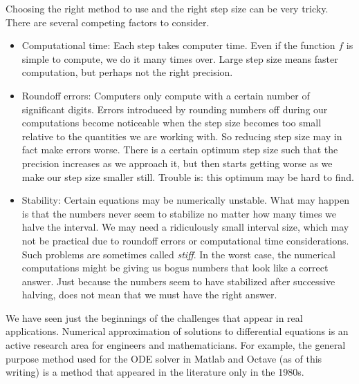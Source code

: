Choosing the right method to use and the right step size can be very tricky.
There are several competing factors to consider.
\begin{itemize}
\item Computational time:  Each step takes computer time.  Even if the
function $f$ is simple to compute, we do it many times over.
Large step size means faster computation, but perhaps not
the right precision.
\item Roundoff errors: Computers only compute with a certain number of
significant digits.  Errors introduced by rounding numbers off during our
computations become noticeable when the step size becomes
too small relative to the quantities we are working with.
So reducing
step size may in fact make errors worse.
There is a certain optimum step size
such that the precision increases as we approach it, but then starts getting
worse as we make our step size
smaller still.  Trouble is: this optimum may be hard to find.
\item Stability: Certain equations may be numerically unstable.  What may
happen is that the numbers never seem to stabilize no matter how many times
we halve the interval.  We may need a ridiculously small interval size,
which may not be practical due to roundoff errors or computational time
considerations.  Such problems are sometimes called
\emph{stiff}.
In the worst case, the numerical computations might be
giving us bogus numbers that look like a correct answer.  Just because the
numbers seem to have stabilized after successive halving, does not mean that we must
have the right answer.
\end{itemize}

We have seen just the beginnings of the challenges that appear in real
applications.  Numerical approximation of solutions to differential
equations is an active research area for engineers and mathematicians.  For
example, the general purpose method used for the ODE solver in Matlab and
Octave (as of this writing) is a method that appeared in the literature only
in the 1980s.


